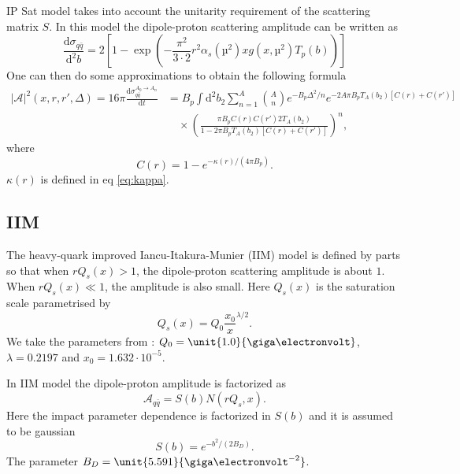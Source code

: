 \documentclass[a4paper,12pt]{article}
\newcommand{\der}{\mathrm{d}}
\newcommand{\A}{\mathcal{A}}
\begin{document}
IP Sat model takes into account the unitarity requirement of the scattering matrix $S$. In this model the dipole-proton scattering amplitude can be written as \cite{PhysRevD.68.114005}
\begin{equation}
	\frac{\der \sigma_{q\bar q}}{\der^2 b} = 2\left[1- \exp \left(-\frac{\pi^2}{3\cdot 2}r^2 \alpha_s(µ^2)xg(x,µ^2) T_p(b)\right) \right]
\end{equation}
One can then do some approximations to obtain the following formula
\begin{equation}
\begin{split}
	|\A|^2(x,r,r',\Delta) = 16\pi \frac{\der \sigma_{q\bar q}^{A_0 \rightarrow A_n}}{\der t} &= B_p \int \der^2 b_2 \sum_{n=1}^A \binom{A}{n} e^{-B_p \Delta^2/n} e^{-2A\pi B_p T_A(b_2)[C(r)+C(r')]} \\
	&\quad \times \left(\frac{\pi B_p C(r)C(r') 2 T_A(b_2)}{1-2\pi B_p T_A(b_2)[C(r)+C(r')]}\right)^n,
\end{split}
\end{equation}
where
\begin{equation}
	C(r) = 1-e^{-\kappa(r)/(4\pi B_p)}.
\end{equation}
$\kappa(r)$ is defined in eq \eqref{eq:kappa}.

\subsection{IIM}
The heavy-quark improved Iancu-Itakura-Munier (IIM) model is defined by parts so that when $rQ_s(x)>1$, the dipole-proton scattering amplitude is about $1$. When $rQ_s(x) \ll 1$, the amplitude is also small. Here $Q_s(x)$ is the saturation scale parametrised by
\begin{equation}
	Q_s(x) = Q_0 \frac{x_0}{x}^{\lambda/2}.
\end{equation}
We take the parameters from \cite{Marquet:2007nf}: $Q_0 = \unit{1.0}{\giga\electronvolt}$, $\lambda = 0.2197$ and $x_0 = 1.632 \cdot 10^{-5}$.

In IIM model the dipole-proton amplitude is factorized as
\begin{equation}
	\A_{q\bar q} = S(b) N(rQ_s,x).
\end{equation}
Here the impact parameter dependence is factorized in $S(b)$ and it is assumed to be gaussian
\begin{equation}
	S(b) = e^{-b^2/(2B_D)}.
\end{equation}
The parameter $B_D = \unit{5.591}{\giga\electronvolt^{-2}}$.
\end{document}
